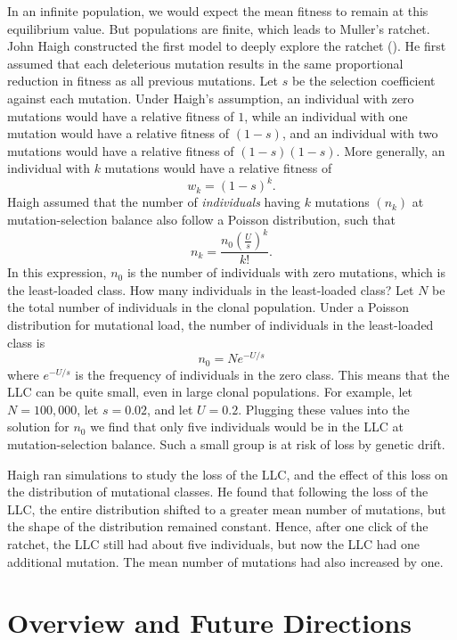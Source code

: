 \documentclass[
  letterpaper,
]{book}
\begin{document}
In an infinite population, we would expect the mean fitness to remain at
this equilibrium value. But populations are finite, which leads to
Muller's ratchet. John Haigh constructed the first model to deeply
explore the ratchet (). He first assumed
that each deleterious mutation results in the same proportional
reduction in fitness as all previous mutations. Let \(s\) be the
selection coefficient against each mutation. Under Haigh's assumption,
an individual with zero mutations would have a relative fitness of
\(1\), while an individual with one mutation would have a relative
fitness of \((1-s)\), and an individual with two mutations would have a
relative fitness of \((1-s)(1-s)\). More generally, an individual with
\(k\) mutations would have a relative fitness of \[w_k=(1-s)^k.\] Haigh
assumed that the number of \emph{individuals} having \(k\) mutations
\((n_k)\) at mutation-selection balance also follow a Poisson
distribution, such that
\[n_k=\frac{n_0\left(\frac{U}{s}\right)^k}{k!}.\] In this expression,
\(n_0\) is the number of individuals with zero mutations, which is the
least-loaded class. How many individuals in the least-loaded class? Let
\(N\) be the total number of individuals in the clonal population. Under
a Poisson distribution for mutational load, the number of individuals in
the least-loaded class is \[n_0=Ne^{-U/s}\] where \(e^{-U/s}\) is the
frequency of individuals in the zero class. This means that the LLC can
be quite small, even in large clonal populations. For example, let
\(N = 100,000\), let \(s = 0.02\), and let \(U = 0.2\). Plugging these
values into the solution for \(n_0\) we find that only five individuals
would be in the LLC at mutation-selection balance. Such a small group is
at risk of loss by genetic drift.

Haigh ran simulations to study the loss of the LLC, and the effect of
this loss on the distribution of mutational classes. He found that
following the loss of the LLC, the entire distribution shifted to a
greater mean number of mutations, but the shape of the distribution
remained constant. Hence, after one click of the ratchet, the LLC still
had about five individuals, but now the LLC had one additional mutation.
The mean number of mutations had also increased by one.


\chapter{Overview and Future
Directions}\label{overview-and-future-directions}
\end{document}
